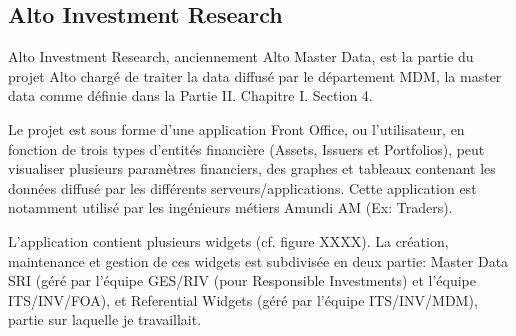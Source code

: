 \subsection{Alto Investment Research}
\par Alto Investment Research, anciennement Alto Master Data, est la partie du projet Alto chargé de traiter la data diffusé par le département MDM, la master data comme définie dans la Partie II. Chapitre I. Section 4.
\par Le projet est sous forme d'une application Front Office, ou l'utilisateur, en fonction de trois types d'entités financière (Assets, Issuers et Portfolios), peut visualiser plusieurs paramètres financiers, des graphes et tableaux contenant les données diffusé par les différents serveurs/applications. Cette application est notamment utilisé par les ingénieurs métiers Amundi AM (Ex: Traders).
\par L'application contient plusieurs widgets (cf. figure XXXX). La création, maintenance et gestion de ces widgets est subdivisée en deux partie: Master Data SRI (géré par l'équipe GES/RIV (pour Responsible Investments) et l'équipe ITS/INV/FOA), et Referential Widgets (géré par l'équipe ITS/INV/MDM), partie sur laquelle je travaillait.

